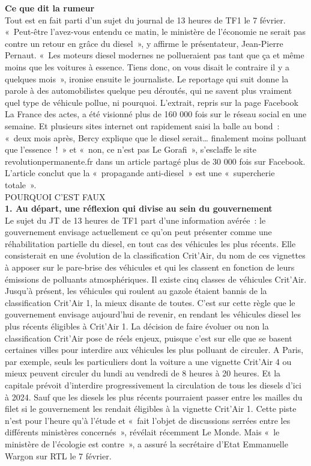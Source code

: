 \documentclass[8pt]{article}
\begin{document}
\textbf{Ce que dit la rumeur}\\

Tout est en fait parti d’un sujet du journal de 13 heures de TF1 le 7 février. «~Peut-être l’avez-vous entendu ce matin, le ministère de l’économie ne serait pas contre un retour en grâce du diesel~», y affirme le présentateur, Jean-Pierre Pernaut. «~Les moteurs diesel modernes ne pollueraient pas tant que ça et même moins que les voitures à essence. Tiens donc, on vous disait le contraire il y a quelques mois~», ironise ensuite le journaliste.
Le reportage qui suit donne la parole à des automobilistes quelque peu déroutés, qui ne savent plus vraiment quel type de véhicule pollue, ni pourquoi. L’extrait, repris sur la page Facebook La France des actes, a été visionné plus de 160 000 fois sur le réseau social en une semaine.
Et plusieurs sites internet ont rapidement saisi la balle au bond~: «~deux mois après, Bercy explique que le diesel serait… finalement moins polluant que l’essence~!~» et «~non, ce n’est pas Le Gorafi~», s’esclaffe le site revolutionpermanente.fr dans un article partagé plus de 30 000 fois sur Facebook. L’article conclut que la «~propagande anti-diesel~» est une «~supercherie totale~».\\

POURQUOI C’EST FAUX\\

\textbf{1. Au départ, une réflexion qui divise au sein du gouvernement}\\

Le sujet du JT de 13 heures de TF1 part d’une information avérée~: le gouvernement envisage actuellement ce qu’on peut présenter comme une réhabilitation partielle du diesel, en tout cas des véhicules les plus récents. Elle consisterait en une évolution de la classification Crit’Air, du nom de ces vignettes à apposer sur le pare-brise des véhicules et qui les classent en fonction de leurs émissions de polluants atmosphériques.
Il existe cinq classes de véhicules Crit’Air. Jusqu’à présent, les véhicules qui roulent au gazole étaient bannis de la classification Crit’Air 1, la mieux disante de toutes. C’est sur cette règle que le gouvernement envisage aujourd’hui de revenir, en rendant les véhicules diesel les plus récents éligibles à Crit’Air 1.
La décision de faire évoluer ou non la classification Crit’Air pose de réels enjeux, puisque c’est sur elle que se basent certaines villes pour interdire aux véhicules les plus polluant de circuler. A Paris, par exemple, seuls les particuliers dont la voiture a une vignette Crit’Air 4 ou mieux peuvent circuler du lundi au vendredi de 8 heures à 20 heures. Et la capitale prévoit d’interdire progressivement la circulation de tous les diesels d’ici à 2024. Sauf que les diesels les plus récents pourraient passer entre les mailles du filet si le gouvernement les rendait éligibles à la vignette Crit’Air 1.
Cette piste n’est pour l’heure qu’à l’étude et «~fait l’objet de discussions serrées entre les différents ministères concernés~», révélait récemment Le Monde. Mais «~le ministère de l’écologie est contre~», a assuré la secrétaire d’Etat Emmanuelle Wargon sur RTL le 7 février.\\
\end{document}
